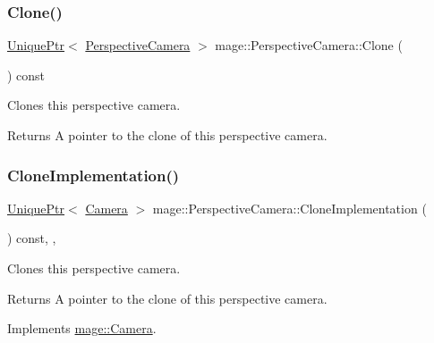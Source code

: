 \subsubsection{\texorpdfstring{Clone()}{Clone()}}
{\footnotesize\ttfamily \hyperlink{namespacemage_a8c307fbcc33bce9b7f2aa4c26c3b95cf}{Unique\+Ptr}$<$ \hyperlink{classmage_1_1_perspective_camera}{Perspective\+Camera} $>$ mage\+::\+Perspective\+Camera\+::\+Clone (\begin{DoxyParamCaption}{ }\end{DoxyParamCaption}) const}

Clones this perspective camera.

\begin{DoxyReturn}{Returns}
A pointer to the clone of this perspective camera. 
\end{DoxyReturn}
\hypertarget{classmage_1_1_perspective_camera_aa597ab884256b7e6fad63653af3ac789}{}\label{classmage_1_1_perspective_camera_aa597ab884256b7e6fad63653af3ac789} 
\subsubsection{\texorpdfstring{Clone\+Implementation()}{CloneImplementation()}}
{\footnotesize\ttfamily \hyperlink{namespacemage_a8c307fbcc33bce9b7f2aa4c26c3b95cf}{Unique\+Ptr}$<$ \hyperlink{classmage_1_1_camera}{Camera} $>$ mage\+::\+Perspective\+Camera\+::\+Clone\+Implementation (\begin{DoxyParamCaption}{ }\end{DoxyParamCaption}) const\hspace{0.3cm}{\ttfamily [override]}, {\ttfamily [private]}, {\ttfamily [virtual]}}

Clones this perspective camera.

\begin{DoxyReturn}{Returns}
A pointer to the clone of this perspective camera. 
\end{DoxyReturn}


Implements \hyperlink{classmage_1_1_camera_aedf6e7d6ee6c6e9e82da814ef8e705ab}{mage\+::\+Camera}.

\hypertarget{classmage_1_1_perspective_camera_ab74cbd2777d5b430da5702a12b1b451e}{}\label{classmage_1_1_perspective_camera_ab74cbd2777d5b430da5702a12b1b451e} 
